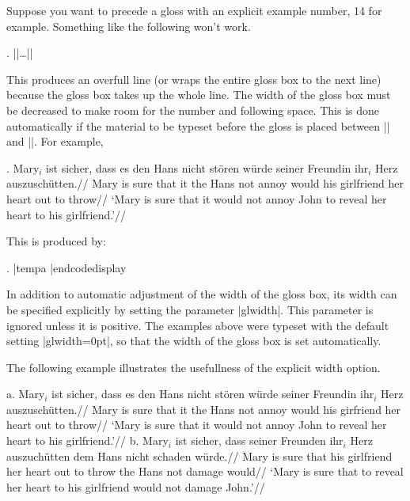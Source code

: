 Suppose you want to precede a gloss with an explicit example
number, 14 for example.  Something like the following won't work.

\bigskip
{}. |\begingl|\kern1pt\dots|\endgl|
\bigskip

\noindent This produces an overfull line (or wraps the entire gloss box to
the next line) because the gloss box takes up the whole line. The
width of the gloss box must be decreased to make room for the
number and following space. This is done automatically if the
material to be typeset before the gloss is placed between
|\begingl| and |\gla|.  For example,

\framedisplay
\exdisplay
{}.\quad
\gla Mary$_i$ ist sicher, dass es den Hans nicht st\"oren w\"urde
seiner Freundin ihr$_i$ Herz auszusch\"utten.//
\glb Mary is sure that it the Hans not annoy would
his girlfriend her heart
{out to throw}//
\glft  `Mary is sure that it would not annoy John to reveal her
heart to his girlfriend.'//
\endgl
\xe
\endframedisplay

This is produced by:

\edef\tempa{{%
   \twelverm\quad$\vdots$\quad
      \raise2pt\hbox{(as in the code for Example \glexample\ above)}\par}}
\codedisplay
{}.\quad
\gla
|tempa
\endgl
|endcodedisplay

In addition to automatic adjustment of the width of the gloss
box, its width can be specified explicitly by setting the
parameter |glwidth|.  This parameter is ignored unless it is
positive.  The examples above were typeset with the default
setting |glwidth=0pt|, so that the width of the gloss box is
set automatically.

The following example illustrates the usefullness of the explicit
width option.

\ex
a.\quad
\begingl[glwidth=2.6in]
\gla Mary$_i$ ist sicher, dass es den Hans nicht st\"oren w\"urde
seiner Freundin ihr$_i$ Herz auszusch\"utten.//
\glb Mary is sure that it the Hans not annoy would
his girfriend her heart {out to
throw}//
\glft  `Mary is sure that it would not annoy John to reveal her
heart to his girlfriend.'//
\endgl
\hfil
b.\quad
\begingl[glwidth=2.6in]
\gla Mary$_i$ ist sicher, dass seiner Freunden ihr$_i$ Herz
auszuch\"utten dem Hans nicht schaden w\"urde.//
\glb Mary is sure that his girlfriend her
heart {out to throw} the Hans not damage would//
\glft `Mary is sure that to reveal her heart to his girlfriend
would not damage John.'//
\endgl
\xe

